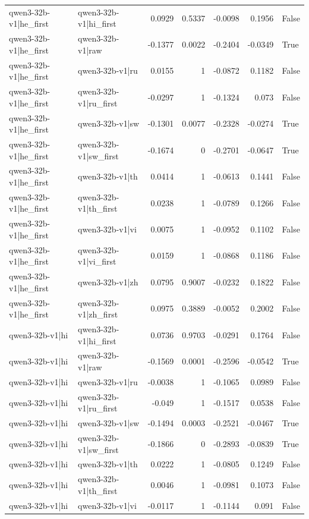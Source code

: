 \begin{table}
\begin{tabular}{l l r r r r l}
qwen3-32b-v1|he_first & qwen3-32b-v1|hi_first & 0.0929 & 0.5337 & -0.0098 & 0.1956 & False \\
qwen3-32b-v1|he_first & qwen3-32b-v1|raw & -0.1377 & 0.0022 & -0.2404 & -0.0349 & True \\
qwen3-32b-v1|he_first & qwen3-32b-v1|ru & 0.0155 & 1 & -0.0872 & 0.1182 & False \\
qwen3-32b-v1|he_first & qwen3-32b-v1|ru_first & -0.0297 & 1 & -0.1324 & 0.073 & False \\
qwen3-32b-v1|he_first & qwen3-32b-v1|sw & -0.1301 & 0.0077 & -0.2328 & -0.0274 & True \\
qwen3-32b-v1|he_first & qwen3-32b-v1|sw_first & -0.1674 & 0 & -0.2701 & -0.0647 & True \\
qwen3-32b-v1|he_first & qwen3-32b-v1|th & 0.0414 & 1 & -0.0613 & 0.1441 & False \\
qwen3-32b-v1|he_first & qwen3-32b-v1|th_first & 0.0238 & 1 & -0.0789 & 0.1266 & False \\
qwen3-32b-v1|he_first & qwen3-32b-v1|vi & 0.0075 & 1 & -0.0952 & 0.1102 & False \\
qwen3-32b-v1|he_first & qwen3-32b-v1|vi_first & 0.0159 & 1 & -0.0868 & 0.1186 & False \\
qwen3-32b-v1|he_first & qwen3-32b-v1|zh & 0.0795 & 0.9007 & -0.0232 & 0.1822 & False \\
qwen3-32b-v1|he_first & qwen3-32b-v1|zh_first & 0.0975 & 0.3889 & -0.0052 & 0.2002 & False \\
qwen3-32b-v1|hi & qwen3-32b-v1|hi_first & 0.0736 & 0.9703 & -0.0291 & 0.1764 & False \\
qwen3-32b-v1|hi & qwen3-32b-v1|raw & -0.1569 & 0.0001 & -0.2596 & -0.0542 & True \\
qwen3-32b-v1|hi & qwen3-32b-v1|ru & -0.0038 & 1 & -0.1065 & 0.0989 & False \\
qwen3-32b-v1|hi & qwen3-32b-v1|ru_first & -0.049 & 1 & -0.1517 & 0.0538 & False \\
qwen3-32b-v1|hi & qwen3-32b-v1|sw & -0.1494 & 0.0003 & -0.2521 & -0.0467 & True \\
qwen3-32b-v1|hi & qwen3-32b-v1|sw_first & -0.1866 & 0 & -0.2893 & -0.0839 & True \\
qwen3-32b-v1|hi & qwen3-32b-v1|th & 0.0222 & 1 & -0.0805 & 0.1249 & False \\
qwen3-32b-v1|hi & qwen3-32b-v1|th_first & 0.0046 & 1 & -0.0981 & 0.1073 & False \\
qwen3-32b-v1|hi & qwen3-32b-v1|vi & -0.0117 & 1 & -0.1144 & 0.091 & False \\

\end{tabular}
\end{table}
